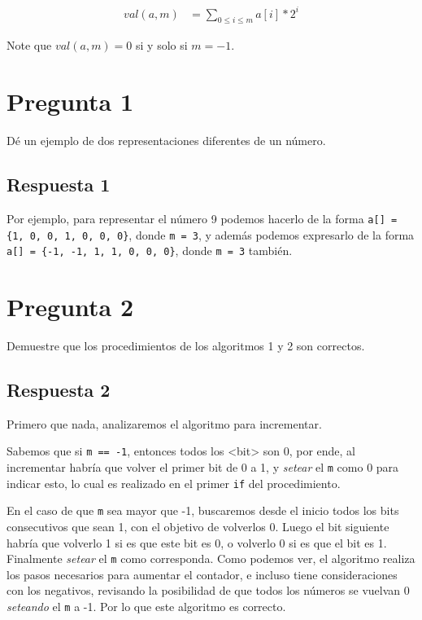 \documentclass[spanish, fleqn]{article}
\begin{document}
\begin{align*}
    val(a, m) &= \sum_{0\leq i \leq m} a[i] * 2^{i}
\end{align*}

Note que $val(a, m) = 0$ si y solo si $m =- 1$.

\section{Pregunta 1}

Dé un ejemplo de dos representaciones diferentes de un número.

\subsection{Respuesta 1}

Por ejemplo, para representar el número 9 podemos hacerlo de la forma \texttt{a[] = \{1, 0, 0, 1, 0, 0, 0\}}, donde \texttt{m = 3}, y además podemos expresarlo de la forma \texttt{a[] = \{-1, -1, 1, 1, 0, 0, 0\}}, donde \texttt{m = 3} también.


\section{Pregunta 2}

Demuestre que los procedimientos de los algoritmos 1 y 2 son correctos.

\subsection{Respuesta 2}

Primero que nada, analizaremos el algoritmo para incrementar.

Sabemos que si \texttt{m == -1}, entonces todos los <bit> son 0, por ende, al incrementar habría que volver el primer bit de 0 a 1, y \textit{setear} el \texttt{m} como 0 para indicar esto, lo cual es realizado en el primer \texttt{if} del procedimiento.

En el caso de que \texttt{m} sea mayor que -1, buscaremos desde el inicio todos los bits consecutivos que sean 1, con el objetivo de volverlos 0. Luego el bit siguiente habría que volverlo 1 si es que este bit es 0, o volverlo 0 si es que el bit es 1. Finalmente \textit{setear} el \texttt{m} como corresponda. Como podemos ver, el algoritmo realiza los pasos necesarios para aumentar el contador, e incluso tiene consideraciones con los negativos, revisando la posibilidad de que todos los números se vuelvan 0 \textit{seteando} el \texttt{m} a -1. Por lo que este algoritmo es correcto.
\end{document}
